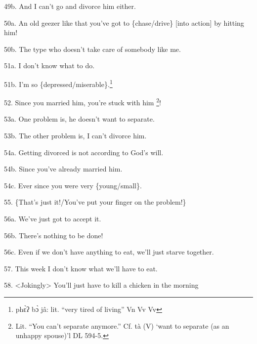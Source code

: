 49b. And I can't go and divorce him either.

50a. An old geezer like that you've got to \{chase/drive\} [into action] by hitting
him!

50b. The type who doesn't take care of somebody like me.

51a. I don't know what to do.

51b. I'm so \{depressed/miserable\}.\footnote{phɛ̀ʔ bɔ̀ jâ: lit. ``very tired of living''  Vn   Vv Vv}

52. Since you married him, you're stuck with him \footnote{Lit. ``You can't separate anymore.'' Cf. tà (V) `want to separate (as an unhappy spouse)'l DL 594-5.}!

53a. One problem is, he doesn't want to separate.

53b. The other problem is, I can't divorce him.

54a. Getting divorced is not according to God's will.

54b. Since you've already married him.

54c. Ever since you were very \{young/small\}.

55. \{That's just it!/You've put your finger on the problem!\}

56a. We've just got to accept it.

56b. There's nothing to be done!

56c. Even if we don't have anything to eat, we'll just starve together.

57. This week I don't know what we'll have to eat.

58. <Jokingly> You'll just have to kill a chicken in the morning

